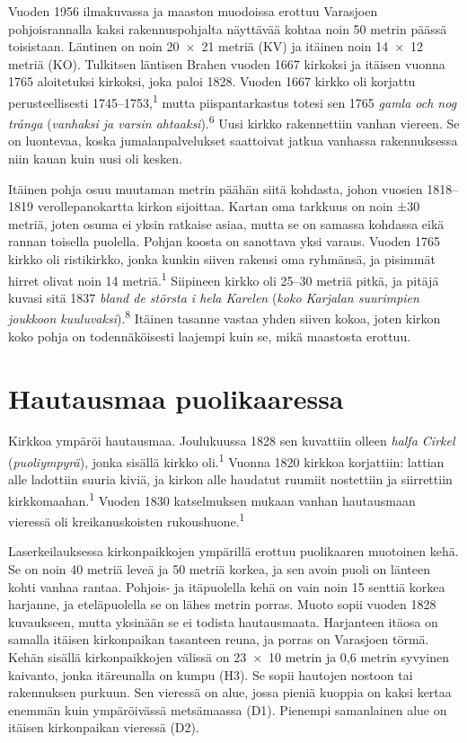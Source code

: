 \documentclass[11pt,a4paper]{article}
\newcommand{\viite}[1]{\textsuperscript{\sffamily\color{leima}#1}}
\newcommand{\sv}[2]{\textit{#1} (\textit{#2})}
\begin{document}
Vuoden 1956 ilmakuvassa ja maaston muodoissa erottuu Varasjoen pohjoisrannalla kaksi rakennuspohjalta näyttävää kohtaa noin 50 metrin päässä toisistaan. Läntinen on noin 20~×~21 metriä (KV) ja itäinen noin 14~×~12 metriä (KO). Tulkitsen läntisen Brahen vuoden 1667 kirkoksi ja itäisen vuonna 1765 aloitetuksi kirkoksi, joka paloi 1828. Vuoden 1667 kirkko oli korjattu perusteellisesti 1745--1753,\viite{1} mutta piispantarkastus totesi sen 1765 \sv{gamla och nog trånga}{vanhaksi ja varsin ahtaaksi}.\viite{6} Uusi kirkko rakennettiin vanhan viereen. Se on luontevaa, koska jumalanpalvelukset saattoivat jatkua vanhassa rakennuksessa niin kauan kuin uusi oli kesken.

Itäinen pohja osuu muutaman metrin päähän siitä kohdasta, johon vuosien 1818--1819 verollepanokartta kirkon sijoittaa. Kartan oma tarkkuus on noin ±30 metriä, joten osuma ei yksin ratkaise asiaa, mutta se on samassa kohdassa eikä rannan toisella puolella. Pohjan koosta on sanottava yksi varaus. Vuoden 1765 kirkko oli ristikirkko, jonka kunkin siiven rakensi oma ryhmänsä, ja pisimmät hirret olivat noin 14 metriä.\viite{1} Siipineen kirkko oli 25--30 metriä pitkä, ja pitäjä kuvasi sitä 1837 \sv{bland de största i hela Karelen}{koko Karjalan suurimpien joukkoon kuuluvaksi}.\viite{8} Itäinen tasanne vastaa yhden siiven kokoa, joten kirkon koko pohja on todennäköisesti laajempi kuin se, mikä maastosta erottuu.

\section{Hautausmaa puolikaaressa}

Kirkkoa ympäröi hautausmaa. Joulukuussa 1828 sen kuvattiin olleen \sv{halfa Cirkel}{puoliympyrä}, jonka sisällä kirkko oli.\viite{1} Vuonna 1820 kirkkoa korjattiin: lattian alle ladottiin suuria kiviä, ja kirkon alle haudatut ruumiit nostettiin ja siirrettiin kirkkomaahan.\viite{1} Vuoden 1830 katselmuksen mukaan vanhan hautausmaan vieressä oli kreikanuskoisten rukoushuone.\viite{1}

Laserkeilauksessa kirkonpaikkojen ympärillä erottuu puolikaaren muotoinen kehä. Se on noin 40 metriä leveä ja 50 metriä korkea, ja sen avoin puoli on länteen kohti vanhaa rantaa. Pohjois- ja itäpuolella kehä on vain noin 15 senttiä korkea harjanne, ja eteläpuolella se on lähes metrin porras. Muoto sopii vuoden 1828 kuvaukseen, mutta yksinään se ei todista hautausmaata. Harjanteen itäosa on samalla itäisen kirkonpaikan tasanteen reuna, ja porras on Varasjoen törmä. Kehän sisällä kirkonpaikkojen välissä on 23~×~10 metrin ja 0,6 metrin syvyinen kaivanto, jonka itäreunalla on kumpu (H3). Se sopii hautojen nostoon tai rakennuksen purkuun. Sen vieressä on alue, jossa pieniä kuoppia on kaksi kertaa enemmän kuin ympäröivässä metsämaassa (D1). Pienempi samanlainen alue on itäisen kirkonpaikan vieressä (D2).
\end{document}
